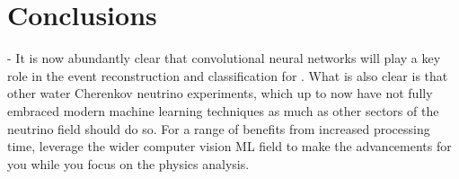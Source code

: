 \chapter{Conclusions}
\label{chap:conclusion}

- It is now abundantly clear that convolutional neural networks will play a key role in the event
reconstruction and classification for \chips. What is also clear is that other water Cherenkov
neutrino experiments, which up to now have not fully embraced modern machine learning techniques
as much as other sectors of the neutrino field should do so. For a range of benefits from
increased processing time, leverage the wider computer vision ML field to make the advancements
for you while you focus on the physics analysis.